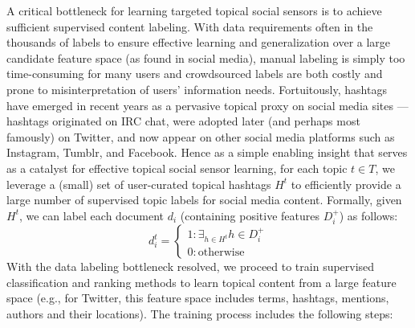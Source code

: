 %
%

A critical bottleneck for learning targeted topical social sensors
is to achieve sufficient supervised content labeling.  With data
requirements often in the thousands of labels to ensure effective
learning and generalization over a large candidate feature space (as
found in social media), manual labeling is simply too time-consuming
for many users and crowdsourced labels are both costly and prone to
misinterpretation of users' information needs.  Fortuitously, hashtags
have emerged in recent years as a pervasive topical proxy on social
media sites --- hashtags originated on IRC chat, were adopted later
(and perhaps most famously) on Twitter, and now appear on other social
media platforms such as Instagram, Tumblr, and Facebook.  Hence as a
simple enabling insight that serves as a catalyst for effective
topical social sensor learning, for each topic $t \in T$, we leverage a (small) set of
user-curated topical hashtags $H^t$ to efficiently provide a large number of
supervised topic labels for social media content.  Formally, given $H^t$, we
can label each document $d_i$ (containing positive features $D_i^+$) as follows:
\begin{equation*}
d_{i}^{t} =
  \begin{cases}
    1: \exists_{h \in H^t} h \in D_i^+ \\
    0: \mathrm{otherwise}
  \end{cases}
\end{equation*}
With the data labeling bottleneck resolved, we proceed to train
supervised classification and ranking methods to learn topical content
from a large feature space (e.g., for Twitter, this feature space
includes terms, hashtags, mentions, authors and their locations). The
training process includes the following steps:
